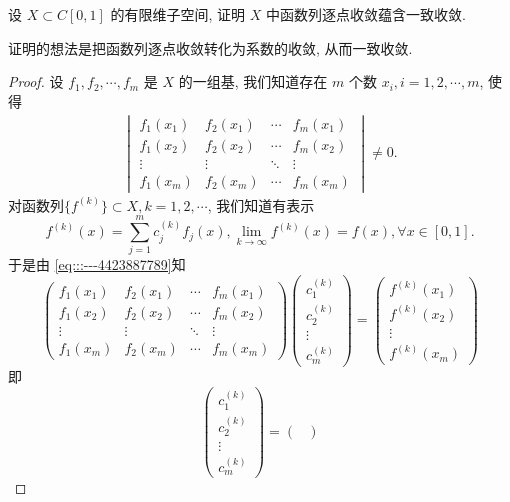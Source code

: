 \documentclass[../../main.tex]{subfiles}%
\begin{document}
\begin{example}
设 \( X \subset C[0,1] \) 的有限维子空间, 证明 \( X \) 中函数列逐点收敛蕴含一致收敛.
\end{example}
\begin{note}
证明的想法是把函数列逐点收敛转化为系数的收敛, 从而一致收敛.
\end{note}
\begin{proof}

设 \( f_1, f_2, \cdots, f_m \) 是 \( X \) 的一组基, 我们知道存在 \( m \) 个数 \( x_i, i = 1, 2, \cdots, m \), 使得
\begin{align}
\begin{vmatrix}
f_1(x_1) & f_2(x_1) & \cdots & f_m(x_1) \\
f_1(x_2) & f_2(x_2) & \cdots & f_m(x_2) \\
\vdots & \vdots & \ddots & \vdots \\
f_1(x_m) & f_2(x_m) & \cdots & f_m(x_m)
\end{vmatrix} \neq 0. \label{eq:::---4423887789}
\end{align}
对函数列\(\{f^{(k)}\} \subset X, k = 1, 2, \cdots \), 我们知道有表示
\[
f^{(k)}(x) = \sum_{j=1}^m c_j^{(k)} f_j(x), \lim_{k \to \infty} f^{(k)}(x) = f(x), \forall x \in [0,1].
\]
于是由 \eqref{eq:::---4423887789}知
\[
\begin{pmatrix}
f_1(x_1) & f_2(x_1) & \cdots & f_m(x_1) \\
f_1(x_2) & f_2(x_2) & \cdots & f_m(x_2) \\
\vdots & \vdots & \ddots & \vdots \\
f_1(x_m) & f_2(x_m) & \cdots & f_m(x_m)
\end{pmatrix}
\begin{pmatrix}
c_1^{(k)} \\
c_2^{(k)} \\
\vdots \\
c_m^{(k)}
\end{pmatrix}
=
\begin{pmatrix}
f^{(k)}(x_1) \\
f^{(k)}(x_2) \\
\vdots \\
f^{(k)}(x_m)
\end{pmatrix}
\]
即
\[
\begin{pmatrix}
c_1^{(k)} \\
c_2^{(k)} \\
\vdots \\
c_m^{(k)}
\end{pmatrix}
=
\begin{pmatrix}

\end{pmatrix}\]
\end{proof}
\end{document}
